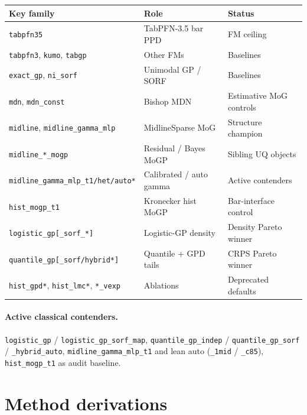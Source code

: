 \documentclass[11pt,a4paper]{article}
\theoremstyle{definition}
\begin{document}
\begin{center}
\renewcommand{\arraystretch}{1.08}
\small
\begin{tabular}{@{}llp{6.6cm}@{}}
\toprule
Key family & Role & Status \\
\midrule
\texttt{tabpfn35} & TabPFN-3.5 bar PPD & FM ceiling \\
\texttt{tabpfn3}, \texttt{kumo}, \texttt{tabgp} & Other FMs & Baselines \\
\texttt{exact\_gp}, \texttt{ni\_sorf} & Unimodal GP / SORF & Baselines \\
\texttt{mdn}, \texttt{mdn\_const} & Bishop MDN & Estimative MoG controls \\
\texttt{midline}, \texttt{midline\_gamma\_mlp} & MidlineSparse MoG & Structure champion \\
\texttt{midline\_*\_mogp} & Residual / Bayes MoGP & Sibling UQ objects \\
\texttt{midline\_gamma\_mlp\_t1/het/auto*} & Calibrated / auto gamma & Active contenders \\
\texttt{hist\_mogp\_t1} & Kronecker hist MoGP & Bar-interface control \\
\texttt{logistic\_gp[\_sorf\_*]} & Logistic-GP density & Density Pareto winner \\
\texttt{quantile\_gp[\_sorf/hybrid*]} & Quantile + GPD tails & CRPS Pareto winner \\
\texttt{hist\_gpd*}, \texttt{hist\_lmc*}, \texttt{*\_vexp} & Ablations & Deprecated defaults \\
\bottomrule
\end{tabular}
\end{center}

\paragraph{Active classical contenders.}
\texttt{logistic\_gp} / \texttt{logistic\_gp\_sorf\_map},
\texttt{quantile\_gp\_indep} / \texttt{quantile\_gp\_sorf} / \texttt{\_hybrid\_auto},
\texttt{midline\_gamma\_mlp\_t1} and lean auto (\texttt{\_1mid} / \texttt{\_c85}),
\texttt{hist\_mogp\_t1} as audit baseline.

\section{Method derivations}
\label{sec:derivations}
\end{document}
